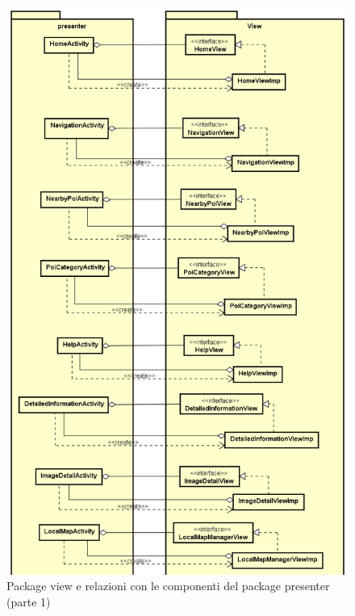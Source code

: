 \documentclass[../DefinizioneDiProdotto.tex,lanscape]{subfiles}
\begin{document}
\begin{figure}[p]
	\centering
	\includegraphics[scale=0.4, keepaspectratio]{img/RelationPackage/view1}
	\caption{Package view e relazioni con le componenti del package presenter (parte 1)}
	\label{viewPackage1}
\end{figure}
\end{document}
